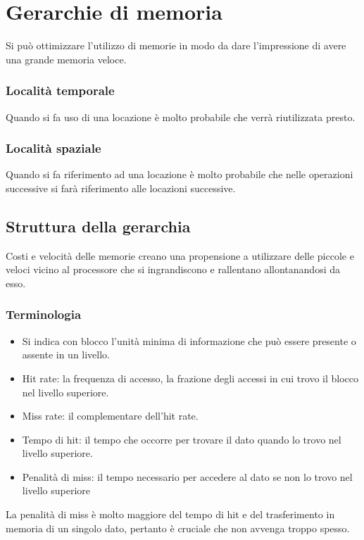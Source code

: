 \section{Gerarchie di memoria}
Si pu\`o ottimizzare l'utilizzo di memorie in modo da dare l'impressione di avere una grande memoria veloce.
\subsubsection{Localit\`a temporale}
Quando si fa uso di una locazione \`e molto probabile che verr\`a riutilizzata presto.
\subsubsection{Localit\`a spaziale}
Quando si fa riferimento ad una locazione \`e molto probabile che nelle operazioni successive si far\`a riferimento alle locazioni successive.
\subsection{Struttura della gerarchia}
Costi e velocit\`a delle memorie creano una propensione a utilizzare delle piccole e veloci vicino al processore che si ingrandiscono e rallentano allontanandosi da 
esso.
\subsubsection{Terminologia}
\begin{itemize}
\item Si indica con blocco l'unit\`a minima di informazione che pu\`o essere presente o assente in un livello.
\item Hit rate: la frequenza di accesso, la frazione degli accessi in cui trovo il blocco nel livello superiore. 
\item Miss rate: il complementare dell'hit rate.
\item Tempo di hit: il tempo che occorre per trovare il dato quando lo trovo nel livello superiore. 
\item Penalit\`a di miss: il tempo necessario per accedere al dato se non lo trovo nel livello superiore
\end{itemize}
La penalit\`a di miss \`e molto maggiore del tempo di hit e del trasferimento in memoria di un singolo dato, pertanto \`e cruciale che non avvenga troppo spesso. 
